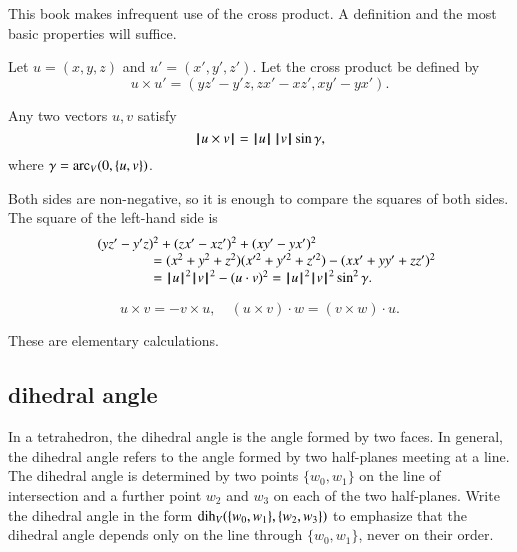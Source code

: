 This book makes infrequent use of the cross product.
A definition and the most basic properties will suffice.

\begin{definition}   Let $u =(x,y,z)$ and $u' = (x',y',z')$.  
Let the cross product be defined
by
    $$
    u \times u' = (y z' - y' z, z x' - x z', x y' - y x').
    $$
\end{definition}

\begin{lemma}  
Any two vectors $u,v$ satisfy
    $${{\hskip0.1em|\hskip-0.15em|\hskip0.1em}u \times v{\hskip0.1em|\hskip-0.15em|\hskip0.1em}} = {{\hskip0.1em|\hskip-0.15em|\hskip0.1em}u{\hskip0.1em|\hskip-0.15em|\hskip0.1em}}\,{{\hskip0.1em|\hskip-0.15em|\hskip0.1em}v{\hskip0.1em|\hskip-0.15em|\hskip0.1em}}\sin\gamma,$$
where $\gamma=\operatorname{arc}_V(0,\{u,v\})$.
\end{lemma}

\begin{proved}
   Both sides are non-negative, so it is enough to compare the
   squares of both sides.  The square of the left-hand side is
   $$
   \begin{array}{lll}
   &(y z'- y'z)^2 + (z x' - x z')^2 + (x y' - y x')^2 \\
    &\qquad\qquad=
   (x^2 + y^2 + z^2)(x'^2 + y'^2 + z'^2) - (x x' + y y' + z z')^2
   \\&\qquad\qquad= {{\hskip0.1em|\hskip-0.15em|\hskip0.1em}u{\hskip0.1em|\hskip-0.15em|\hskip0.1em}}^2{{\hskip0.1em|\hskip-0.15em|\hskip0.1em}v{\hskip0.1em|\hskip-0.15em|\hskip0.1em}}^2 - (u\cdot v)^2 = {{\hskip0.1em|\hskip-0.15em|\hskip0.1em}u{\hskip0.1em|\hskip-0.15em|\hskip0.1em}}^2{{\hskip0.1em|\hskip-0.15em|\hskip0.1em}v{\hskip0.1em|\hskip-0.15em|\hskip0.1em}}^2 \sin^2\gamma.
   \end{array}
   $$
\swallowed\end{proved}


\begin{lemma}
    $$
    u\times v = -v\times u,\quad
    (u\times v)\cdot w = (v\times w)\cdot u.
    $$
\end{lemma}

\begin{proved}
These are elementary calculations.
\swallowed\end{proved}



\subsection{dihedral angle}

In a tetrahedron, the dihedral angle is
the angle formed by two faces.  In general,
the dihedral angle refers to the angle formed by two half-planes
meeting at a line.  The dihedral angle is determined
by two points $\{w_0,w_1\}$ on the line of intersection
and a further point $w_2$ and $w_3$ on each of the two half-planes.
Write the dihedral angle in the form $\operatorname{dih}_V(\{w_0,w_1\},\{w_2,w_3\})$ to emphasize that the dihedral angle depends only
on the line through $\{w_0,w_1\}$, never on their order.

